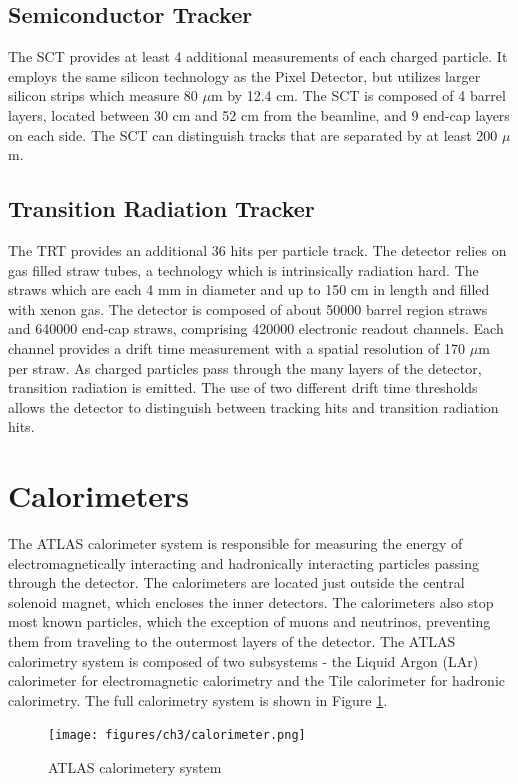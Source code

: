 \subsection{Semiconductor Tracker}
The SCT provides at least 4 additional measurements of each charged particle. It employs the same silicon technology as the Pixel Detector, but utilizes larger silicon strips which measure 80 $\mu$m by 12.4 cm. The SCT is composed of 4 barrel layers, located between 30 cm and 52 cm from the beamline, and 9 end-cap layers on each side. The SCT can distinguish tracks that are separated by at least 200 $\mu$m.

\subsection{Transition Radiation Tracker}
The TRT provides an additional 36 hits per particle track. The detector relies on gas filled straw tubes, a technology which is intrinsically radiation hard. The straws which are each 4 mm in diameter and up to 150 cm in length and filled with xenon gas. The detector is composed of about 50000 barrel region straws and 640000 end-cap straws, comprising 420000 electronic readout channels. Each channel provides a drift time measurement with a spatial resolution of 170 $\mu$m per straw. As charged particles pass through the many layers of the detector, transition radiation is emitted. The use of two different drift time thresholds allows the detector to distinguish between tracking hits and transition radiation hits. 

\section{Calorimeters}
The ATLAS calorimeter system is responsible for measuring the energy of electromagnetically interacting and hadronically interacting particles passing through the detector. The calorimeters are located just outside the central solenoid magnet, which encloses the inner detectors. The calorimeters also stop most known particles, which the exception of muons and neutrinos, preventing them from traveling to the outermost layers of the detector. The ATLAS calorimetry system is composed of two subsystems - the Liquid Argon (LAr) calorimeter for electromagnetic calorimetry and the Tile calorimeter for hadronic calorimetry. The full calorimetry system is shown in Figure \ref{fig:calorimeters}.

\begin{figure}
        \centering
	\texttt{[image: figures/ch3/calorimeter.png]}
	\caption{ATLAS calorimetery system \cite{calorimeter_img}}
	\label{fig:calorimeters}
\end{figure}

